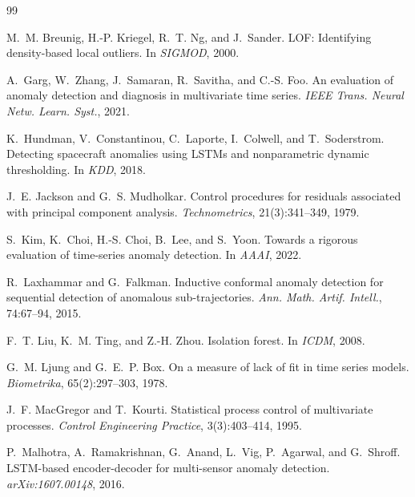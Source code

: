 \documentclass[twocolumn,10pt]{article}
\begin{document}
\begin{thebibliography}{99}\small
\setlength{\itemsep}{1pt}

M.~M. Breunig, H.-P. Kriegel, R.~T. Ng, and J.~Sander.
\newblock LOF: Identifying density-based local outliers.
\newblock In \emph{SIGMOD}, 2000.

A.~Garg, W.~Zhang, J.~Samaran, R.~Savitha, and C.-S. Foo.
\newblock An evaluation of anomaly detection and diagnosis in multivariate time
  series.
\newblock \emph{IEEE Trans. Neural Netw. Learn. Syst.}, 2021.

K.~Hundman, V.~Constantinou, C.~Laporte, I.~Colwell, and T.~Soderstrom.
\newblock Detecting spacecraft anomalies using LSTMs and nonparametric dynamic
  thresholding.
\newblock In \emph{KDD}, 2018.

J.~E. Jackson and G.~S. Mudholkar.
\newblock Control procedures for residuals associated with principal component
  analysis.
\newblock \emph{Technometrics}, 21(3):341--349, 1979.

S.~Kim, K.~Choi, H.-S. Choi, B.~Lee, and S.~Yoon.
\newblock Towards a rigorous evaluation of time-series anomaly detection.
\newblock In \emph{AAAI}, 2022.

R.~Laxhammar and G.~Falkman.
\newblock Inductive conformal anomaly detection for sequential detection of
  anomalous sub-trajectories.
\newblock \emph{Ann. Math. Artif. Intell.}, 74:67--94, 2015.

F.~T. Liu, K.~M. Ting, and Z.-H. Zhou.
\newblock Isolation forest.
\newblock In \emph{ICDM}, 2008.

G.~M. Ljung and G.~E.~P. Box.
\newblock On a measure of lack of fit in time series models.
\newblock \emph{Biometrika}, 65(2):297--303, 1978.

J.~F. MacGregor and T.~Kourti.
\newblock Statistical process control of multivariate processes.
\newblock \emph{Control Engineering Practice}, 3(3):403--414, 1995.

P.~Malhotra, A.~Ramakrishnan, G.~Anand, L.~Vig, P.~Agarwal, and G.~Shroff.
\newblock LSTM-based encoder-decoder for multi-sensor anomaly detection.
\newblock \emph{arXiv:1607.00148}, 2016.


\end{thebibliography}
\end{document}
